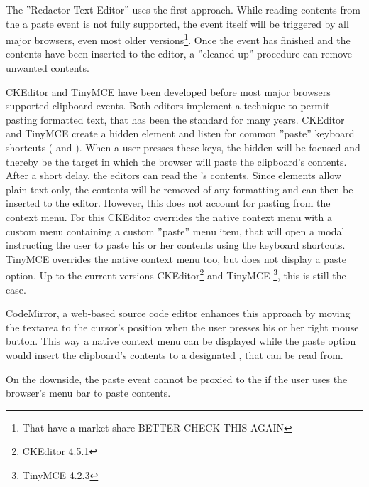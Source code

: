 The ''Redactor Text Editor'' uses the first approach. While reading contents from the a paste event is not fully supported, the event itself will be triggered by all major browsers, even most older versions\footnote{That have a market share BETTER CHECK THIS AGAIN}. Once the event has finished and the contents have been inserted to the editor, a ''cleaned up'' procedure can remove unwanted contents.

CKEditor and TinyMCE have been developed before most major browsers supported clipboard events. Both editors implement a technique to permit pasting formatted text, that has been the standard for many years. CKEditor and TinyMCE create a hidden  element and listen for common ''paste'' keyboard shortcuts ( and ). When a user presses these keys, the hidden  will be focused and thereby be the target in which the browser will paste the clipboard's contents. After a short delay, the editors can read the 's contents. Since  elements allow plain text only, the contents will be removed of any formatting and can then be inserted to the editor. However, this does not account for pasting from the context menu. For this CKEditor overrides the native context menu with a custom menu containing a custom ''paste'' menu item, that will open a modal instructing the user to paste his or her contents using the keyboard shortcuts. TinyMCE overrides the native context menu too, but does not display a paste option. Up to the current versions CKEditor\footnote{CKEditor 4.5.1 } and TinyMCE \footnote{TinyMCE 4.2.3}, this is still the case.

CodeMirror, a web-based source code editor enhances this approach by moving the textarea to the cursor's position when the user presses his or her right mouse button. This way a native context menu can be displayed while the paste option would insert the clipboard's contents to a designated , that can be read from.

On the downside, the paste event cannot be proxied to the  if the user uses the browser's menu bar to paste contents.


